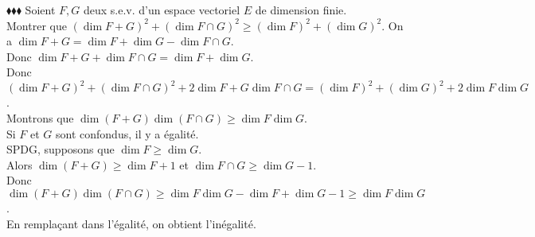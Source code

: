 \documentclass[11pt]{article}
\begin{document}
\begin{exercice}{$\blacklozenge\blacklozenge\blacklozenge$}{}
    Soient $F,G$ deux s.e.v. d'un espace vectoriel $E$ de dimension finie.\\
    Montrer que $(\dim F + G)^2 + (\dim F \cap G)^2 \geq (\dim F)^2 + (\dim G)^2$.
    \tcblower
    On a $\dim F+G = \dim F + \dim G - \dim F \cap G$.\\
    Donc $\dim F+G + \dim F \cap G = \dim F + \dim G$.\\
    Donc $(\dim F+G)^2 + (\dim F \cap G)^2 + 2\dim F + G \dim F \cap G = (\dim F)^2 + (\dim G)^2 + 2\dim F \dim G$.\\
    Montrons que $\dim(F+G)\dim(F \cap G) \geq \dim F \dim G$.\\
    Si $F$ et $G$ sont confondus, il y a égalité.\\
    SPDG, supposons que $\dim F \geq \dim G$.\\
    Alors $\dim(F + G) \geq \dim F + 1$ et $\dim F \cap G \geq \dim G - 1$.\\
    Donc $\dim(F + G)\dim(F \cap G) \geq \dim F \dim G - \dim F + \dim G - 1 \geq \dim F \dim G$.\\
    En remplaçant dans l'égalité, on obtient l'inégalité.
\end{exercice}
\end{document}
